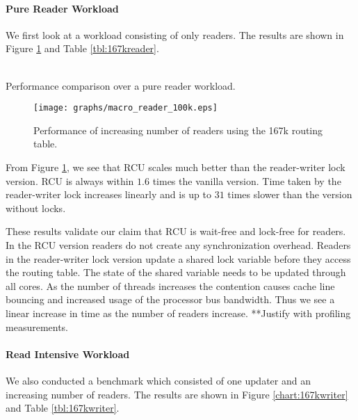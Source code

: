 \paragraph{Pure Reader Workload}
 We first look at a workload consisting of only readers. The results are shown in Figure \ref{chart:167kreader} and Table \ref{tbl:167kreader}.
\\\\ 
\begin{table}[tph]
\begin{center}

\end{center}
\label{tbl:167kreader}
\caption{Performance comparison over a pure reader workload.}
\end{table}
\begin{figure}[tph]
\texttt{[image: graphs/macro\_reader\_100k.eps]}
\caption{Performance of increasing number of readers using the 167k routing table.}
\label{chart:167kreader}
\end{figure}

From Figure \ref{chart:167kreader}, we see that RCU scales much better than the reader-writer lock version. RCU is always within $1.6$ times the vanilla version. Time taken by the reader-writer lock increases linearly and is up to $31$ times slower than the version without locks.

These results validate our claim that RCU is wait-free and lock-free for readers. In the RCU version readers do not create any synchronization overhead. Readers in the reader-writer lock version update a shared lock variable before they access the routing table. The state of the shared variable needs to be updated through all cores. As the number of threads increases the contention causes cache line bouncing and increased usage of the processor bus bandwidth. Thus we see a linear increase in time as the number of readers increase. **Justify with profiling measurements.

\paragraph{Read Intensive Workload}
We also conducted a benchmark which consisted of one updater and an increasing number of readers. The results are shown in Figure \ref{chart:167kwriter} and Table \ref{tbl:167kwriter}.

